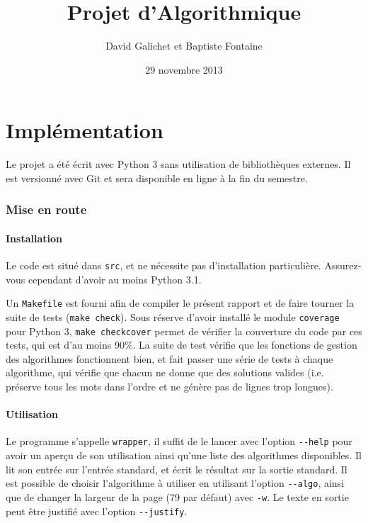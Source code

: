 \documentclass[a4paper, 11pt]{article}
\begin{document}
\title{Projet d'Algorithmique}
\author{David Galichet et Baptiste Fontaine}
\date{29 novembre 2013}
\maketitle
\tableofcontents
\newpage


\part{Implémentation}

Le projet a été écrit avec Python 3 sans utilisation de bibliothèques externes.
Il est versionné avec Git et sera disponible en ligne à la fin du semestre.

\section{Mise en route}
\subsection{Installation}

Le code est situé dans \verb|src|, et ne nécessite pas d'installation
particulière. Assurez-vous cependant d'avoir au moins Python 3.1.

Un \verb|Makefile| est fourni afin de compiler le présent rapport et de faire
tourner la suite de tests (\verb|make check|). Sous réserve d'avoir installé le
module \verb|coverage| pour Python 3, \verb|make checkcover| permet de vérifier
la couverture du code par ces tests, qui est d'au moins 90\%. La suite de test
vérifie que les fonctions de gestion des algorithmes fonctionnent bien, et fait
passer une série de tests à chaque algorithme, qui vérifie que chacun ne donne
que des solutions valides (i.e. préserve tous les mots dans l'ordre et ne génère
pas de lignes trop longues).

\subsection{Utilisation}

Le programme s'appelle \verb|wrapper|, il suffit de le lancer avec l'option
\verb|--help| pour avoir un aperçu de son utilisation ainsi qu'une liste des
algorithmes disponibles. Il lit son entrée sur l'entrée standard, et écrit le
résultat sur la sortie standard. Il est possible de choisir l'algorithme à
utiliser en utilisant l'option \verb|--algo|, ainsi que de changer la largeur
de la page (79 par défaut) avec \verb|-w|. Le texte en sortie peut être
justifié avec l'option \verb|--justify|.
\end{document}
